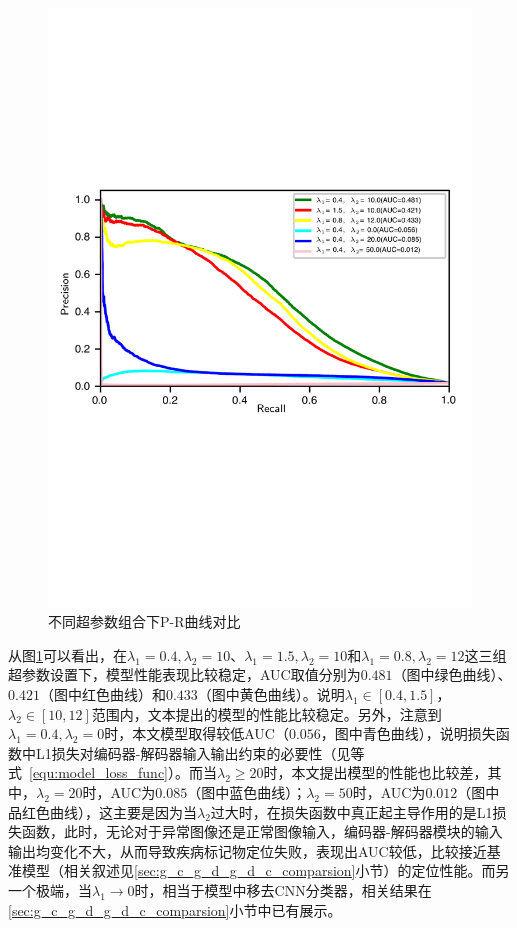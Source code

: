 \begin{figure}[h]
	\centering
	\includegraphics[width=1.0\textwidth]{figure/pr_curve_retinal_hyper_paras/pr_curve.pdf}
	\caption{不同超参数组合下P-R曲线对比} 
	\label{fig:pr_curve_retinal_hyper_paras}
\end{figure}

从图\ref{fig:pr_curve_retinal_hyper_paras}可以看出，在$\lambda_{1}=0.4, \lambda_{2}=10$、$\lambda_{1}=1.5,\lambda_{2}=10$和$\lambda_{1}=0.8,\lambda_{2}=12$这三组超参数设置下，模型性能表现比较稳定，AUC取值分别为$0.481$（图中绿色曲线）、$0.421$（图中红色曲线）和$0.433$（图中黄色曲线）。说明$\lambda_{1}\in [0.4,1.5]$，$\lambda_{2}\in [10,12]$范围内，文本提出的模型的性能比较稳定。另外，注意到$\lambda_{1}=0.4,\lambda_{2}=0$时，本文模型取得较低AUC（$0.056$，图中青色曲线），说明损失函数中L1损失对编码器-解码器输入输出约束的必要性（见等式~\ref{equ:model_loss_func}）。而当$\lambda_{2}\geq 20$时，本文提出模型的性能也比较差，其中，$\lambda_{2}=20$时，AUC为$0.085$（图中蓝色曲线）；$\lambda_{2}=50$时，AUC为$0.012$（图中品红色曲线），这主要是因为当$\lambda_{2}$过大时，在损失函数中真正起主导作用的是L1损失函数，此时，无论对于异常图像还是正常图像输入，编码器-解码器模块的输入输出均变化不大，从而导致疾病标记物定位失败，表现出AUC较低，比较接近基准模型（相关叙述见\ref{sec:g_c_g_d_g_d_c_comparsion}小节）的定位性能。而另一个极端，当$\lambda_{1}\rightarrow 0$时，相当于模型中移去CNN分类器，相关结果在\ref{sec:g_c_g_d_g_d_c_comparsion}小节中已有展示。

